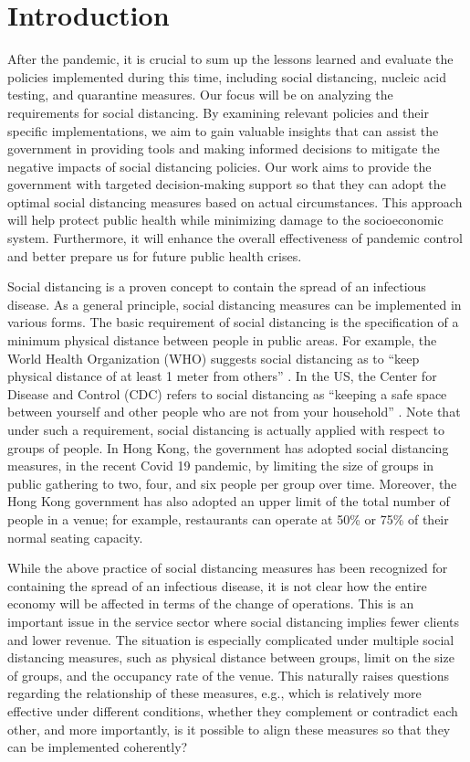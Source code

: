 \section{Introduction}
After the pandemic, it is crucial to sum up the lessons learned and evaluate the policies implemented during this time, including social distancing, nucleic acid testing, and quarantine measures. Our focus will be on analyzing the requirements for social distancing. By examining relevant policies and their specific implementations, we aim to gain valuable insights that can assist the government in providing tools and making informed decisions to mitigate the negative impacts of social distancing policies. Our work aims to provide the government with targeted decision-making support so that they can adopt the optimal social distancing measures based on actual circumstances. This approach will help protect public health while minimizing damage to the socioeconomic system. Furthermore, it will enhance the overall effectiveness of pandemic control and better prepare us for future public health crises.

Social distancing is a proven concept to contain the spread of an infectious disease. As a general principle, social distancing measures can be implemented in various forms. The basic requirement of social distancing is the specification of a minimum physical distance between people in public areas. For example, the World Health Organization (WHO) suggests social distancing as to ``keep physical distance of at least 1 meter from others'' \cite{AdviceforPublic}. In the US, the Center for Disease and Control (CDC) refers to social distancing as ``keeping a safe space between yourself and other people who are not from your household'' \cite{CDC}. 
Note that under such a requirement, social distancing is actually applied with respect to groups of people. In Hong Kong, the government has adopted social distancing measures, in the recent Covid 19 pandemic, by limiting the size of groups in public gathering to two, four, and six people per group over time. Moreover, the Hong Kong government has also adopted an upper limit of the total number of people in a venue; for example, restaurants can operate at 50\% or 75\% of their normal seating capacity.

While the above practice of social distancing measures has been recognized for containing the spread of an infectious disease,  it is not clear how the entire economy will be affected in terms of the change of operations. This is an important issue in the service sector where social distancing implies fewer clients and lower revenue. The situation is especially complicated under multiple social distancing measures, such as physical distance between groups, limit on the size of groups, and the occupancy rate of the venue. This naturally raises questions regarding the relationship of these measures, e.g., which is relatively more effective under different conditions, whether they complement or contradict each other, and more importantly, is it possible to align these measures so that they can be implemented coherently? 


